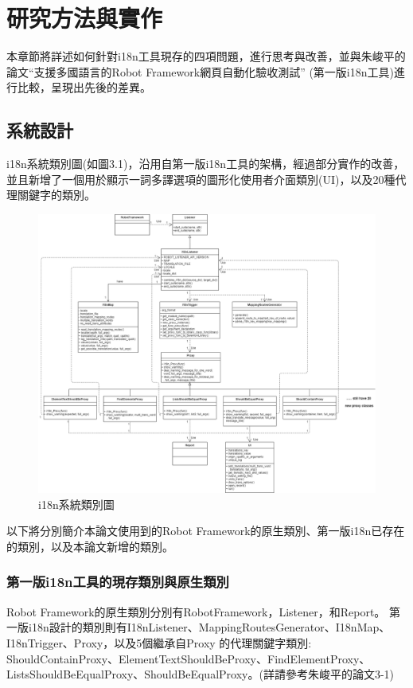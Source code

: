 \chapter{研究方法與實作}
本章節將詳述如何針對i18n工具現存的四項問題，進行思考與改善，並與朱峻平的論文“支援多國語言的Robot Framework網頁自動化驗收測試” (第一版i18n工具)進行比較，呈現出先後的差異。

\section{系統設計}
i18n系統類別圖(如圖3.1)，沿用自第一版i18n工具的架構，經過部分實作的改善，並且新增了一個用於顯示一詞多譯選項的圖形化使用者介面類別(UI)，以及20種代理關鍵字的類別。 

\begin{figure}[H]
\centering
\includegraphics[width= 1.1\textwidth]{../UML/i18n class diagram-i18n class diagram.png}
\caption{i18n系統類別圖}
\end{figure}

以下將分別簡介本論文使用到的Robot Framework的原生類別、第一版i18n已存在的類別，以及本論文新增的類別。

\subsection{第一版i18n工具的現存類別與原生類別}
Robot Framework的原生類別分別有RobotFramework，Listener，和Report。
第一版i18n設計的類別則有I18nListener、MappingRoutesGenerator、I18nMap、I18nTrigger、Proxy，以及5個繼承自Proxy \cite{proxy} 的代理關鍵字類別: ShouldContainProxy、ElementTextShouldBeProxy、FindElementProxy、ListsShouldBeEqualProxy、ShouldBeEqualProxy。(詳請參考朱峻平的論文3-1)

